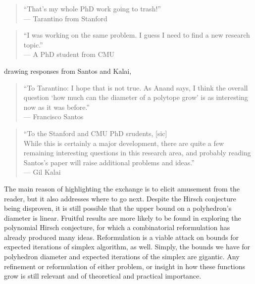 \documentclass[11pt,a4paper]{article}
\theoremstyle{definition}
\begin{document}
\begin{quote}
``That's my whole PhD work going to trash!'' \\
--- Tarantino from Stanford
\end{quote}
\begin{quote}
``I was working on the same problem. I guess I need to find a new research topic.'' \\
--- A PhD student from CMU
\end{quote}
drawing responses from Santos and Kalai,
\begin{quote}
``To Tarantino: I hope that is not true. As Anand says, I think the overall question `how much can the diameter of a polytope grow' is as interesting now as it was before.''\\
--- Francisco Santos
\end{quote}
\begin{quote}
	``To the Stanford and CMU PhD srudents, [sic]\\
	While this is certainly a major development, there are quite a few remaining interesting questions in this research area, and probably reading Santos's paper will raise additional problems and ideas.''\\
	--- Gil Kalai
\end{quote}
The main reason of highlighting the exchange is to elicit amusement from the reader, but it also addresses where to go next. Despite the Hirsch conjecture being disproven, it is still possible that the upper bound on a polyhedron's diameter is linear. Fruitful results are more likely to be found in exploring the polynomial Hirsch conjecture, for which a combinatorial reformulation has already produced many ideas. Reformulation is a viable attack on bounds for expected iterations of simplex algorithm, as well. Simply, the bounds we have for polyhedron diameter and expected iterations of the simplex are gigantic. Any refinement or reformulation of either problem, or insight in how these functions grow is still relevant and of theoretical and practical importance.



\end{document}
